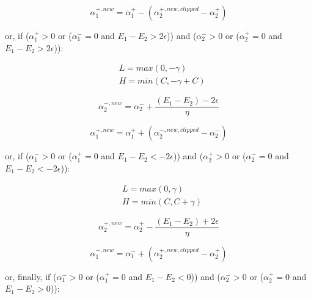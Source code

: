 \begin{equation} \label{eq:smo_svr_a1_new1}
	\alpha_1^{+,new} = \alpha_1^+ - (\alpha_2^{+,new,clipped} - \alpha_2^+)
\end{equation}

or, if ($\alpha_1^+ > 0$ or ($\alpha_1^- = 0$ and $ E_1 - E_2 > 2 \epsilon$)) and ($\alpha_2^- > 0$ or ($\alpha_2^+ = 0$ and $ E_1 - E_2 > 2 \epsilon$)):

\begin{equation} \label{eq:smo_svr_bounds_update2}
	\begin{aligned}
		& L = max(0, -\gamma) \\
		& H = min(C, -\gamma + C)
	\end{aligned}
\end{equation}

\begin{equation} \label{eq:smo_svr_a2_new2}
	\alpha_2^{-,new} = \alpha_2^- + \frac{(E_1 - E_2) - 2 \epsilon}{\eta}
\end{equation}

\begin{equation} \label{eq:smo_svr_a1_new2}
	\alpha_1^{+,new} = \alpha_1^+ + (\alpha_2^{-,new,clipped} - \alpha_2^-)
\end{equation}

or, if ($\alpha_1^- > 0$ or ($\alpha_1^+ = 0$ and $ E_1 - E_2 < - 2 \epsilon$)) and ($\alpha_2^+ > 0$ or ($\alpha_2^- = 0$ and $ E_1 - E_2 < - 2 \epsilon$)):

\begin{equation} \label{eq:smo_svr_bounds_update3}
	\begin{aligned}
		& L = max(0, \gamma) \\
		& H = min(C, C + \gamma)
	\end{aligned}
\end{equation}

\begin{equation} \label{eq:smo_svr_a2_new3}
	\alpha_2^{+,new} = \alpha_2^+ - \frac{(E_1 - E_2) + 2 \epsilon}{\eta}
\end{equation}

\begin{equation} \label{eq:smo_svr_a1_new3}
	\alpha_1^{-,new} = \alpha_1^- + (\alpha_2^{+,new,clipped} - \alpha_2^+)
\end{equation}

or, finally, if ($\alpha_1^- > 0$ or ($\alpha_1^+ = 0$ and $ E_1 - E_2 < 0$)) and ($\alpha_2^- > 0$ or ($\alpha_2^+ = 0$ and $ E_1 - E_2 > 0$)):

